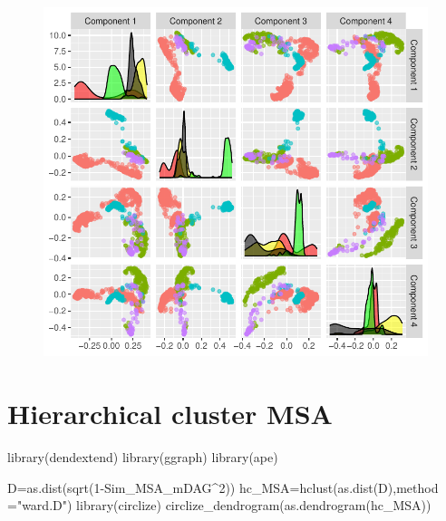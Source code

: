 \documentclass[
  letterpaper,
  DIV=11,
  numbers=noendperiod]{scrreprt}
\newenvironment{Shaded}{}{}
\newcommand{\AttributeTok}[1]{\textcolor[rgb]{0.78,0.47,0.87}{#1}}
\newcommand{\DecValTok}[1]{\textcolor[rgb]{0.82,0.60,0.40}{#1}}
\newcommand{\FunctionTok}[1]{\textcolor[rgb]{0.38,0.69,0.94}{#1}}
\newcommand{\NormalTok}[1]{\textcolor[rgb]{0.67,0.70,0.75}{#1}}
\newcommand{\OtherTok}[1]{\textcolor[rgb]{0.15,0.68,0.38}{#1}}
\newcommand{\SpecialCharTok}[1]{\textcolor[rgb]{0.34,0.71,0.76}{#1}}
\newcommand{\StringTok}[1]{\textcolor[rgb]{0.60,0.76,0.47}{#1}}
\begin{document}
\begin{figure}[H]

{\centering \includegraphics[width=1\textwidth,height=\textheight]{index_files/figure-pdf/unnamed-chunk-32-1.pdf}

}

\end{figure}


\hypertarget{hierarchical-cluster-msa}{%
\chapter{Hierarchical cluster MSA}\label{hierarchical-cluster-msa}}

\begin{Shaded}
\begin{Highlighting}[]
\FunctionTok{library}\NormalTok{(dendextend)}
\FunctionTok{library}\NormalTok{(ggraph)}
\FunctionTok{library}\NormalTok{(ape)}

\NormalTok{D}\OtherTok{=}\FunctionTok{as.dist}\NormalTok{(}\FunctionTok{sqrt}\NormalTok{(}\DecValTok{1}\SpecialCharTok{{-}}\NormalTok{Sim\_MSA\_mDAG}\SpecialCharTok{\^{}}\DecValTok{2}\NormalTok{))}
\NormalTok{hc\_MSA}\OtherTok{=}\FunctionTok{hclust}\NormalTok{(}\FunctionTok{as.dist}\NormalTok{(D),}\AttributeTok{method =}\StringTok{"ward.D"}\NormalTok{)}
\FunctionTok{library}\NormalTok{(circlize)}
\FunctionTok{circlize\_dendrogram}\NormalTok{(}\FunctionTok{as.dendrogram}\NormalTok{(hc\_MSA))}
\end{Highlighting}
\end{Shaded}
\end{document}
